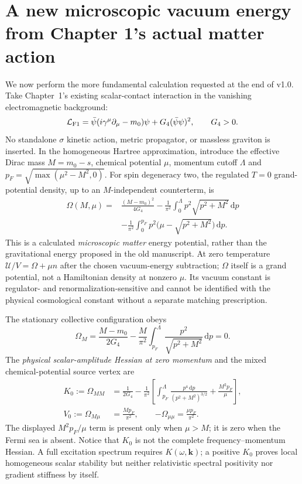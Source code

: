 \documentclass[11pt,a4paper]{article}
\theoremstyle{definition}\newtheorem{definition}[theorem]{Definition}
\theoremstyle{remark}\newtheorem{remark}[theorem]{Remark}
\newcommand{\dd}{\mathrm d}
\begin{document}
\section{A new microscopic vacuum energy from Chapter 1's actual matter action}
\label{sec:microscopicenergy}
We now perform the more fundamental calculation requested at the end of v1.0. Take Chapter~1's existing scalar-contact interaction in the vanishing electromagnetic background:
\begin{equation}\label{eq:micro-lag}
\mathcal L_{\rm F1}=\bar\psi(i\gamma^\mu\partial_\mu-m_0)\psi+G_4(\bar\psi\psi)^2,\qquad G_4>0.
\end{equation}
No standalone $\sigma$ kinetic action, metric propagator, or massless graviton is inserted. In the homogeneous Hartree approximation, introduce the effective Dirac mass $M=m_0-s$, chemical potential $\mu$, momentum cutoff $\Lambda$ and $p_F=\sqrt{\max(\mu^2-M^2,0)}$. For spin degeneracy two, the regulated $T=0$ grand-potential density, up to an $M$-independent counterterm, is
\begin{equation}\label{eq:micro-omega}
\boxed{\begin{aligned}
\Omega(M,\mu)={}&\frac{(M-m_0)^2}{4G_4}
-\frac1{\pi^2}\int_0^\Lambda p^2\sqrt{p^2+M^2}\,\dd p\\
&-\frac1{\pi^2}\int_0^{p_F}p^2\bigl(\mu-\sqrt{p^2+M^2}\bigr)\,\dd p.
\end{aligned}}
\end{equation}
This is a calculated \emph{microscopic matter} energy potential, rather than the gravitational energy proposed in the old manuscript. At zero temperature $\mathcal U/V=\Omega+\mu n$ after the chosen vacuum-energy subtraction; $\Omega$ itself is a grand potential, not a Hamiltonian density at nonzero $\mu$. Its vacuum constant is regulator- and renormalization-sensitive and cannot be identified with the physical cosmological constant without a separate matching prescription.

The stationary collective configuration obeys
\begin{equation}\label{eq:micro-gap}
\boxed{\Omega_M=\frac{M-m_0}{2G_4}-\frac M{\pi^2}\int_{p_F}^{\Lambda}\frac{p^2}{\sqrt{p^2+M^2}}\,\dd p=0.}
\end{equation}
The \emph{physical scalar-amplitude Hessian at zero momentum} and the mixed chemical-potential source vertex are
\begin{align}
\boxed{K_0:=\Omega_{MM}}&=\frac1{2G_4}-\frac1{\pi^2}\left[\int_{p_F}^{\Lambda}\frac{p^4\,\dd p}{(p^2+M^2)^{3/2}}+\frac{M^2p_F}{\mu}\right],\label{eq:micro-K}\\
\boxed{V_0:=\Omega_{M\mu}}&=\frac{Mp_F}{\pi^2},\qquad\boxed{-\Omega_{\mu\mu}=\frac{\mu p_F}{\pi^2}}.\label{eq:micro-V}
\end{align}
The displayed $M^2p_F/\mu$ term is present only when $\mu>M$; it is zero when the Fermi sea is absent. Notice that $K_0$ is not the complete frequency--momentum Hessian. A full excitation spectrum requires $K(\omega,\bm k)$; a positive $K_0$ proves local homogeneous scalar stability but neither relativistic spectral positivity nor gradient stiffness by itself.
\end{document}

